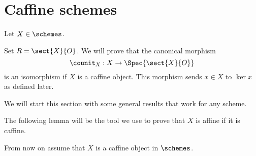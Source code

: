 \section{Caffine schemes}

Let $X\in \schemes$.

Set $R = \sect{X}{O}$.
We will prove that the canonical morphism \[\counit_X: X \rightarrow \Spec{\sect{X}{O}}\] is an isomorphism if $X$ is a caffine object.
This morphism sends $x\in X$ to $\ker{x}$ as defined later.

We will start this section with some general results that work for any scheme.







The following lemma will be the tool we use to prove that $X$ is affine if it is caffine.






From now on assume that $X$ is a caffine object in $\schemes$.






